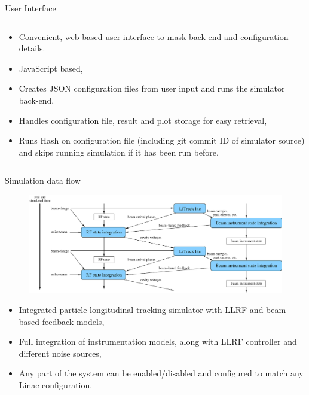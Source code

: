\documentclass[final]{beamer}
\begin{document}
\begin{frame}{}
\begin{block}{User Interface}
\begin{columns}
		    \begin{column}{0.3\textwidth}
	          \begin{itemize}
	            \item Convenient, web-based user interface to mask back-end and configuration details.
		     \item JavaScript based,
		     \item Creates JSON configuration files from user input and runs the simulator back-end,
		     \item Handles configuration file, result and plot storage for easy retrieval,
		     \item Runs Hash on configuration file (including git commit ID of simulator source) and skips running simulation if it has been run before.
		    \end{itemize}
		    \end{column}
		  \end{columns}
		\end{block}
    \begin{columns}[t]
      \begin{column}{.47\textwidth}
        \begin{block}{Simulation data flow}
	\begin{figure}
	  \centering
	  \includegraphics[width=\textwidth]{model_do2.eps}
	\end{figure}
	\begin{itemize}
	 \item Integrated particle longitudinal tracking simulator with LLRF and beam-based feedback models,
	 \item Full integration of instrumentation models, along with LLRF controller and different noise sources,
	 \item Any part of the system can be enabled/disabled and configured to match any Linac configuration.
	\end{itemize}



\end{block}
\end{column}
\end{columns}
\end{frame}
\end{document}
